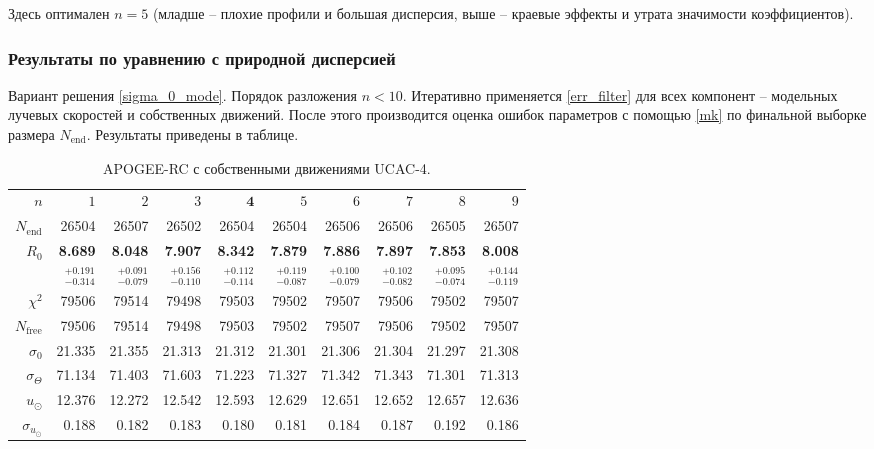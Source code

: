 \documentclass{matmex-diploma-custom}
\begin{document}
Здесь оптимален $n = 5$ (младше -- плохие профили и большая дисперсия, выше -- краевые эффекты и утрата значимости коэффициентов).

\pagebreak

\subsubsection{Результаты по уравнению с природной дисперсией}
Вариант решения \ref{sigma_0_mode}. Порядок разложения $n < 10$. Итеративно применяется \ref{err_filter} для всех компонент -- модельных лучевых скоростей и собственных движений. После этого производится оценка ошибок параметров с помощью \ref{mk} по финальной выборке размера $N_{\mathrm{end}}$. Результаты приведены в таблице. 
\begin{table}[h!!]
\centering
\caption{APOGEE-RC с собственными движениями UCAC-4.}
\begin{tabular}{r|rrr|rrr|rrr}
\hline
$n$ & $1$ & $2$ & $3$ & $\textbf{4}$ & $5$&$ 6 $&$ 7 $&$ 8 $&$ 9 $\\
 $N_{\mathrm{end}}$ & 26504       &   26507 &   26502 &   26504 &   26504 &   26506 &   26506 &   26505 &   26507 \\
 $R_0 $& \textbf{8.689}       &   \textbf{8.048} &   \textbf{7.907} &   \textbf{8.342} &   \textbf{7.879} &   \textbf{7.886} &   \textbf{7.897} &   \textbf{7.853} &   \textbf{8.008} \\
       & $_{-0.314}^{+0.191} $ & $_{-0.079}^{+0.091}$ & $_{-0.110}^{+0.156}$   & $_{-0.114}^{+0.112}$  & $_{-0.087}^{+0.119}$  & $_{-0.079}^{+0.100}$  & $_{-0.082}^{+0.102}$  & $_{-0.074}^{+0.095}$  & $_{-0.119}^{+0.144}$  \\\hline
 $\chi^2 $& 79506   &   79514 &   79498 &   79503 &   79502 &   79507 &   79506 &   79502 &   79507 \\
 $N_{\mathrm{free}} $& 79506      &  79514 &   79498 &   79503 &   79502 &   79507 &   79506 &   79502 &   79507 \\
 $\sigma_0 $& 21.335      &  21.355 &  21.313 &  21.312 &  21.301 &  21.306 &  21.304 &  21.297 &  21.308  \\ 
 $\sigma_{\Theta} $& 71.134      &  71.403 &  71.603 &  71.223 &  71.327 &  71.342 &  71.343 &  71.301 &  71.313  \\\hline 
 $ u_{\odot} $& 12.376      &  12.272 &  12.542 &  12.593 &  12.629 &  12.651 &  12.652 &  12.657 &  12.636 \\
 $\sigma_{u_{\odot}} $&0.188       &   0.182 &   0.183 &    0.180 &   0.181 &   0.184 &   0.187 &   0.192 &   0.186 \\

\end{tabular}
\end{table}
\end{document}
